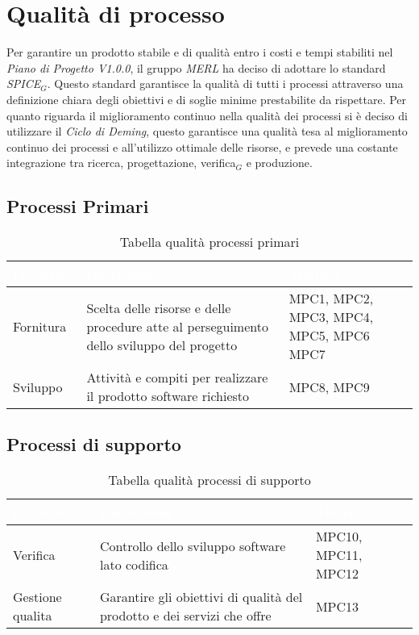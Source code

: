 \chapter{Qualità di processo}
Per garantire un prodotto stabile e di qualità entro i costi e tempi stabiliti nel \textit{Piano di Progetto V1.0.0}, il gruppo \textit{MERL} ha deciso di adottare lo standard \textit{SPICE}$_G$. Questo standard garantisce la qualità di tutti i processi attraverso una definizione chiara degli obiettivi e di soglie minime prestabilite da rispettare.
Per quanto riguarda il miglioramento continuo nella qualità dei processi si è deciso di utilizzare il \textit{Ciclo di Deming}, questo garantisce una qualità tesa al miglioramento continuo dei processi e all'utilizzo ottimale delle risorse, e prevede una costante integrazione tra ricerca, progettazione, verifica$_G$ e produzione.

\section{Processi Primari}
\begin{table}[H]
  \renewcommand{\arraystretch}{1.25}
  \begin{tabular}{|p{2.5cm}|p{8cm}|p{3cm}|} \hline
    \rowcolor[HTML]{036400}
    \textcolor{white}{\textbf{Obiettivo}} & \textcolor{white}{\textbf{Descrizione}} & \textcolor{white}{\textbf{Metrica}}  \\ \hline
    \rowcolor[HTML]{EFEFEF}
    Fornitura & Scelta delle risorse e delle procedure atte al perseguimento dello sviluppo del progetto & MPC1, MPC2, \newline MPC3, MPC4, \newline MPC5, MPC6 \newline MPC7     \\ \hline
    \rowcolor[HTML]{C0C0C0}
    Sviluppo & Attività e compiti per realizzare il prodotto software richiesto & MPC8, MPC9 \\ \hline
  \end{tabular}
  \caption{Tabella qualità processi primari}
\end{table}


\section{Processi di supporto}
\begin{table}[H]
  \renewcommand{\arraystretch}{1.25}
  \begin{tabular}{|p{2.5cm}|p{8cm}|p{1.7cm}|} \hline
    \rowcolor[HTML]{036400}
    \textcolor{white}{\textbf{Obiettivo}} & \textcolor{white}{\textbf{Descrizione}} & \textcolor{white}{\textbf{Metrica}}  \\ \hline
    \rowcolor[HTML]{EFEFEF}
    Verifica & Controllo dello sviluppo software lato codifica & MPC10, MPC11, MPC12  \\ \hline
    \rowcolor[HTML]{C0C0C0}
    Gestione qualita & Garantire gli obiettivi di qualità del prodotto e dei servizi che offre & MPC13  \\ \hline
  \end{tabular}
  \caption{Tabella qualità processi di supporto}
\end{table}


